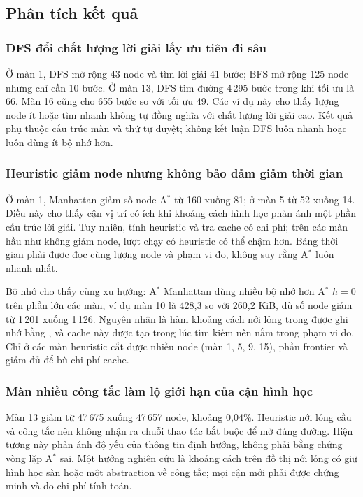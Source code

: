 \documentclass[a4paper]{article}
\newcommand{\tep}[1]{{\small\ttfamily\detokenize{#1}}}
\newcommand{\astar}{\texorpdfstring{A\ensuremath{^*}}{A*}}
\begin{document}
\subsection{Phân tích kết quả}
\subsubsection{DFS đổi chất lượng lời giải lấy ưu tiên đi sâu}
Ở màn 1, DFS mở rộng 43 node và tìm lời giải 41 bước; BFS mở rộng 125 node nhưng chỉ cần 10 bước. Ở màn 13, DFS tìm đường 4\,295 bước trong khi tối ưu là 66. Màn 16 cũng cho 655 bước so với tối ưu 49. Các ví dụ này cho thấy lượng node ít hoặc tìm nhanh không tự đồng nghĩa với chất lượng lời giải cao. Kết quả phụ thuộc cấu trúc màn và thứ tự duyệt; không kết luận DFS luôn nhanh hoặc luôn dùng ít bộ nhớ hơn.

\subsubsection{Heuristic giảm node nhưng không bảo đảm giảm thời gian}
Ở màn 1, Manhattan giảm số node \astar{} từ 160 xuống 81; ở màn 5 từ 52 xuống 14. Điều này cho thấy cận vị trí có ích khi khoảng cách hình học phản ánh một phần cấu trúc lời giải. Tuy nhiên, tính heuristic và tra cache có chi phí; trên các màn hầu như không giảm node, lượt chạy có heuristic có thể chậm hơn. Bảng thời gian phải được đọc cùng lượng node và phạm vi đo, không suy rằng \astar{} luôn nhanh nhất.

Bộ nhớ cho thấy cùng xu hướng: \astar{} Manhattan dùng nhiều bộ nhớ hơn \astar{} $h=0$ trên phần lớn các màn, ví dụ màn 10 là 428,3 so với 260,2 KiB, dù số node giảm từ 1\,201 xuống 1\,126. Nguyên nhân là hàm khoảng cách nới lỏng trong \tep{heuristics.py} được ghi nhớ bằng \tep{lru_cache}, và cache này được tạo trong lúc tìm kiếm nên nằm trong phạm vi đo. Chỉ ở các màn heuristic cắt được nhiều node (màn 1, 5, 9, 15), phần frontier và \tep{best_g} giảm đủ để bù chi phí cache.

\subsubsection{Màn nhiều công tắc làm lộ giới hạn của cận hình học}
Màn 13 giảm từ 47\,675 xuống 47\,657 node, khoảng 0,04\%. Heuristic nới lỏng cầu và công tắc nên không nhận ra chuỗi thao tác bắt buộc để mở đúng đường. Hiện tượng này phản ánh độ yếu của thông tin định hướng, không phải bằng chứng vòng lặp \astar{} sai. Một hướng nghiên cứu là khoảng cách trên đồ thị nới lỏng có giữ hình học sàn hoặc một abstraction về công tắc; mọi cận mới phải được chứng minh và đo chi phí tính toán.
\end{document}

